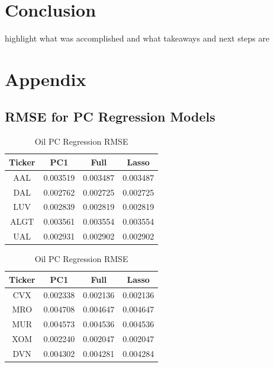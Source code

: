 \documentclass{article}
\begin{document}
\section{Conclusion}
highlight what was accomplished and what takeaways and next steps are

\newpage
\section{Appendix}

\subsection{RMSE for PC Regression Models}
\begin{table}[!htb]
    \begin{minipage}{.5\linewidth}
      \caption{Airline PC Regression RMSE}
      \centering
      \begin{tabular}{ c|c|c|c }
        \textbf{Ticker} & \textbf{PC1} & \textbf{Full} & \textbf{Lasso} \\
        \hline
        AAL	& 0.003519 & 0.003487 & 0.003487\\
        DAL	& 0.002762 & 0.002725 & 0.002725\\
        LUV	& 0.002839 & 0.002819 & 0.002819\\
        ALGT & 0.003561 & 0.003554 & 0.003554\\
        UAL	& 0.002931 & 0.002902 & 0.002902\\
        \end{tabular}
    \end{minipage}%
    \begin{minipage}{.5\linewidth}
      \centering
        \caption{Oil PC Regression RMSE}
        \begin{tabular}{ c|c|c|c  }
            \textbf{Ticker} & \textbf{PC1} & \textbf{Full} & \textbf{Lasso} \\
            \hline
            CVX	& 0.002338	& 0.002136	& 0.002136\\
            MRO	& 0.004708	& 0.004647	& 0.004647\\
            MUR	& 0.004573	& 0.004536	& 0.004536\\
            XOM	& 0.002240	& 0.002047	& 0.002047\\
            DVN	& 0.004302	& 0.004281	& 0.004284\\
        \end{tabular}
    \end{minipage} 
\end{table}
\end{document}
